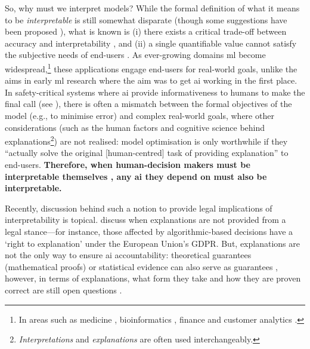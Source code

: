 So, why must we interpret models? While the formal definition of what it means to be \textit{interpretable} is still somewhat disparate (though some suggestions have been proposed \citep{Lipton:2016if}), what is known is (i) there exists a critical trade-off between accuracy and interpretability \citep{Freitas:2004vv,Jin:2006uf,Kaufman:1999vg,Grunwald:2007vg,Domingos:1998ug,Zahalka:2011ux}, and (ii) a single quantifiable value cannot satisfy the subjective needs of end-users \citep{Freitas:2014ic}. As ever-growing domains \gls{ml} become widespread,\footnote{In areas such as medicine \citep{Bellazzi:2008tv,Lavrac:1999tf,Pazzani:2001tw,Richards:2001vw,Zupan:2000tp,VanAssche:2007wc,Johansson:2009uo,Elazmeh:2007tp,Wong:2006ve,Jaspers:2011hy,Bussone:2015wm}, bioinformatics \citep{Freitas:2010vk,Szafron:2004uf,Karwath:2002tv,Doderer:2006vt,Jiang:2005ua}, finance \citep{Baehrens:2010tj,Huysmans:2011gq,Dhar:2000vo} and customer analytics \citep{Verbeke:2011vo,Lima:2009tm}.} these applications engage end-users for real-world goals, unlike the aims in early \gls{ml} research where the aim was to get \gls{ai} working in the first place. In safety-critical systems where \gls{ai} provide informativeness to humans to make the final call (see \citep{Caruana:2015jk,Kim:2015vo,Huysmans:2011gq}), there is often a mismatch between the formal objectives of the model (e.g., to minimise error) and complex real-world goals, where other considerations (such as the human factors and cognitive science behind explanations\footnote{\textit{Interpretations} and \textit{explanations} are often used interchangeably.}) are not realised: model optimisation is only worthwhile if they ``actually solve the original [human-centred] task of providing explanation'' \citep{Narayanan:2018ud} to end-users. \textbf{Therefore, when human-decision makers must be interpretable themselves \citep{Ridgeway:1998ud}, any \gls{ai} they depend on must also be interpretable.} 

Recently, discussion behind such a notion to provide legal implications of interpretability is topical. \citet{DoshiVelez:2017vm} discuss when explanations are not provided from a legal stance---for instance, those affected by algorithmic-based decisions have a `right to explanation' \citep{Goodman:2016wf,Wachter:2017hx} under the European Union's GDPR. But, explanations are not the only way to ensure \gls{ai} accountability: theoretical guarantees (mathematical proofs) or statistical evidence can also serve as guarantees \citep{DoshiVelez:2017vm}, however, in terms of explanations, what form they take and how they are proven correct are still open questions \citep{Lipton:2016if}.

